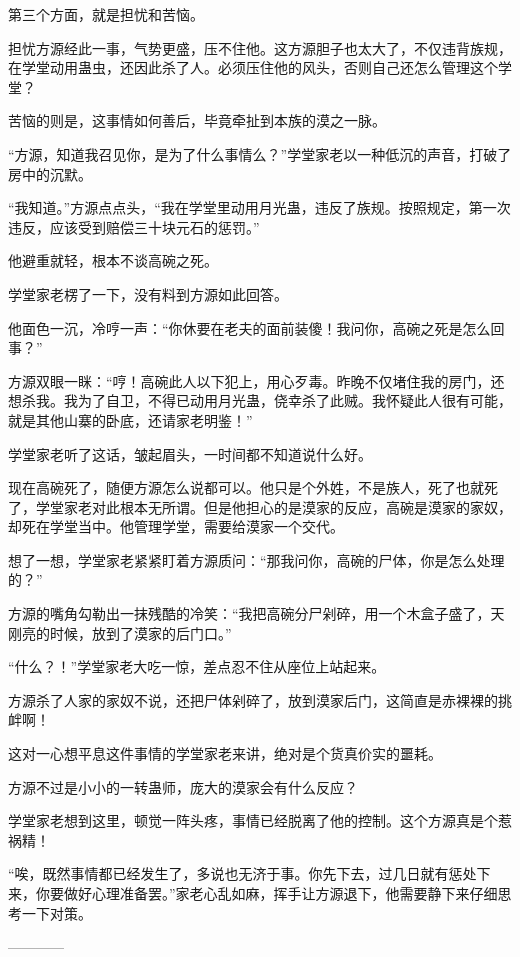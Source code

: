 \begin{this_body}
第三个方面，就是担忧和苦恼。

担忧方源经此一事，气势更盛，压不住他。这方源胆子也太大了，不仅违背族规，在学堂动用蛊虫，还因此杀了人。必须压住他的风头，否则自己还怎么管理这个学堂？

苦恼的则是，这事情如何善后，毕竟牵扯到本族的漠之一脉。

“方源，知道我召见你，是为了什么事情么？”学堂家老以一种低沉的声音，打破了房中的沉默。

“我知道。”方源点点头，“我在学堂里动用月光蛊，违反了族规。按照规定，第一次违反，应该受到赔偿三十块元石的惩罚。”

他避重就轻，根本不谈高碗之死。

学堂家老楞了一下，没有料到方源如此回答。

他面色一沉，冷哼一声：“你休要在老夫的面前装傻！我问你，高碗之死是怎么回事？”

方源双眼一眯：“哼！高碗此人以下犯上，用心歹毒。昨晚不仅堵住我的房门，还想杀我。我为了自卫，不得已动用月光蛊，侥幸杀了此贼。我怀疑此人很有可能，就是其他山寨的卧底，还请家老明鉴！”

学堂家老听了这话，皱起眉头，一时间都不知道说什么好。

现在高碗死了，随便方源怎么说都可以。他只是个外姓，不是族人，死了也就死了，学堂家老对此根本无所谓。但是他担心的是漠家的反应，高碗是漠家的家奴，却死在学堂当中。他管理学堂，需要给漠家一个交代。

想了一想，学堂家老紧紧盯着方源质问：“那我问你，高碗的尸体，你是怎么处理的？”

方源的嘴角勾勒出一抹残酷的冷笑：“我把高碗分尸剁碎，用一个木盒子盛了，天刚亮的时候，放到了漠家的后门口。”

“什么？！”学堂家老大吃一惊，差点忍不住从座位上站起来。

方源杀了人家的家奴不说，还把尸体剁碎了，放到漠家后门，这简直是赤裸裸的挑衅啊！

这对一心想平息这件事情的学堂家老来讲，绝对是个货真价实的噩耗。

方源不过是小小的一转蛊师，庞大的漠家会有什么反应？

学堂家老想到这里，顿觉一阵头疼，事情已经脱离了他的控制。这个方源真是个惹祸精！

“唉，既然事情都已经发生了，多说也无济于事。你先下去，过几日就有惩处下来，你要做好心理准备罢。”家老心乱如麻，挥手让方源退下，他需要静下来仔细思考一下对策。

------------

\end{this_body}

